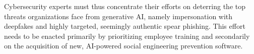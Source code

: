 Cybersecurity experts must thus concentrate their efforts on deterring the top threats organizations face from generative AI, namely impersonation with deepfakes and highly targeted, seemingly authentic spear phishing. This effort needs to be enacted primarily by prioritizing employee training and secondarily on the acquisition of new, AI-powered social engineering prevention software.

%
%
